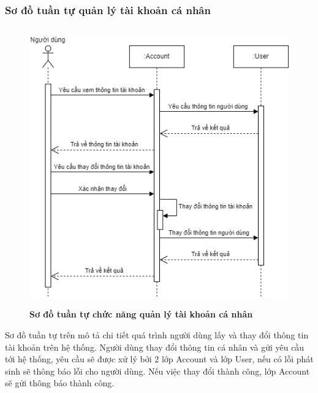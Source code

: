 \subsubsection{Sơ đồ tuần tự quản lý tài khoản cá nhân}
\begin{figure}[H]
  \centering
  \includegraphics[width=12cm,height=12cm]{Images/sequence/sequence_manage_info.png}
  \caption[Sơ đồ tuần tự chức năng quản lý tài khoản cá nhân]{\bfseries \fontsize{12pt}{0pt}
  \selectfont Sơ đồ tuần tự chức năng quản lý tài khoản cá nhân}
  \label{sequence_account} %
\end{figure}
Sơ đồ tuần tự trên mô tả chi tiết quá trình người dùng lấy và thay đổi thông tin tài khoản trên hệ thống. Người dùng thay đổi thông tin cá nhân và gửi yêu cầu tới hệ thống, 
yêu cầu sẽ được xử lý bởi 2 lớp Account và lớp User, nếu có lỗi phát sinh sẽ thông báo lỗi cho người dùng. Nếu việc thay đổi thành công, lớp Account sẽ gửi thông báo 
thành công.  

